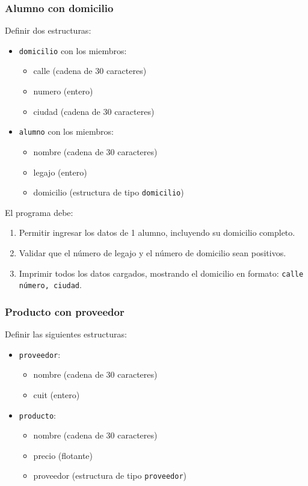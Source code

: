\subsubsection{Alumno con domicilio}

Definir dos estructuras:

\begin{itemize}
\item \texttt{domicilio} con los miembros:
\begin{itemize}
\item calle (cadena de 30 caracteres)
\item numero (entero)
\item ciudad (cadena de 30 caracteres)
\end{itemize}

\item \texttt{alumno} con los miembros:
\begin{itemize}
\item nombre (cadena de 30 caracteres)
\item legajo (entero)
\item domicilio (estructura de tipo \texttt{domicilio})
\end{itemize}
\end{itemize}

El programa debe:

\begin{enumerate}
\item Permitir ingresar los datos de 1 alumno, incluyendo su domicilio completo.
\item Validar que el número de legajo y el número de domicilio sean positivos.
\item Imprimir todos los datos cargados, mostrando el domicilio en formato:
\texttt{calle número, ciudad}.
\end{enumerate}

\subsubsection{Producto con proveedor}

Definir las siguientes estructuras:

\begin{itemize}
\item \texttt{proveedor}:
\begin{itemize}
\item nombre (cadena de 30 caracteres)
\item cuit (entero)
\end{itemize}
\item \texttt{producto}:
\begin{itemize}
\item nombre (cadena de 30 caracteres)
\item precio (flotante)
\item proveedor (estructura de tipo \texttt{proveedor})
\end{itemize}
\end{itemize}


